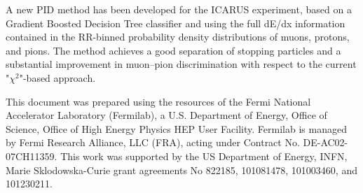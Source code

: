 \documentclass[nocopyright]{cimento}
\begin{document}
A new PID method has been developed for the ICARUS experiment, based on a Gradient Boosted Decision Tree classifier and using the full dE/dx information contained in the RR-binned probability density distributions of muons, protons, and pions. The method achieves a good separation of stopping particles and a substantial improvement in muon–pion discrimination with respect to the current "$\chi^2$"-based approach. 

\acknowledgments

This document was prepared using the resources of the Fermi National Accelerator Laboratory (Fermilab), a U.S. Department of Energy, Office of Science, Office of High Energy Physics HEP User Facility. Fermilab is managed by Fermi Research Alliance, LLC (FRA), acting under Contract No. DE-AC02-07CH11359. This work was supported by the US Department of Energy, INFN, Marie Sklodowska-Curie grant agreements No 822185, 101081478, 101003460, and 101230211.
\end{document}
